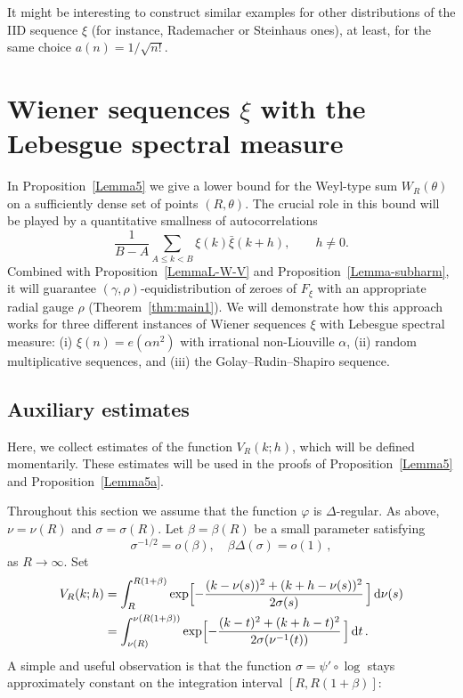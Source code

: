 \documentclass[11pt]{amsart}
\numberwithin{equation}{section}
\begin{document}
It might be interesting to construct similar examples for other distributions
of the IID sequence $\xi$ (for instance, Rademacher or Steinhaus ones),
at least, for the same choice $a(n)=1/\sqrt{n!}$.

\section{Wiener sequences $\xi$ with the Lebesgue spectral measure}
\label{sect:7}

In Proposition~\ref{Lemma5} we give a lower bound for the Weyl-type sum $W_R(\theta)$ on
a sufficiently dense set of points $(R, \theta)$. The crucial role in this bound will be
played by a quantitative smallness of autocorrelations
$$
\frac1{B-A}\sum_{A\le k < B} \xi(k)\bar\xi(k+h), \qquad h\ne 0. 
$$
Combined
with Proposition~\ref{LemmaL-W-V} and Proposition~\ref{Lemma-subharm}, 
it will guarantee $(\gamma, \rho)$-equidistribution
of zeroes of $F_\xi$ with an appropriate radial gauge $\rho$ (Theorem~\ref{thm:main1}).
We will demonstrate how this approach works for three different instances of Wiener sequences
$\xi$ with Lebesgue spectral measure: (i) $\xi (n) = e(\alpha n^2)$ with irrational non-Liouville $\alpha$, (ii) random multiplicative sequences, and (iii) the Golay--Rudin--Shapiro sequence.

\subsection{Auxiliary estimates}
Here, we collect estimates of the function \newline\noindent $V_R(k; h)$, which will be defined
momentarily. These estimates will be used in the proofs of Proposition~\ref{Lemma5}
and Proposition~\ref{Lemma5a}.

Throughout this section we assume that the function $\varphi$ is $\Delta$-regular.
As above, $\nu=\nu(R)$ and $\sigma=\sigma(R)$. Let $\beta=\beta(R)$ be a small parameter
satisfying
\[
\sigma^{-1/2} = o(\beta), \quad
\beta\Delta(\sigma) = o(1)\,,
\]
as $R\to\infty$. Set
\begin{align*}
V_R(k; h) &= \int_R^{R(1+\beta)}
\exp\Bigl[ -\frac{(k-\nu(s))^2 + (k+h-\nu(s))^2}{2\sigma(s)}\, \Bigr]\, {\rm d}\nu(s) \\
&=
\int_{\nu(R)}^{\nu(R(1+\beta))}
\exp\Bigl[ -\frac{(k-t)^2 + (k+h-t)^2}{2\sigma(\nu^{-1}(t))}\, \Bigr]\, {\rm d}t\,.
\end{align*}
A simple and useful observation is that the function $\sigma = \psi'\circ\log $ stays
approximately constant on the integration interval $[R, R(1+\beta)]$:
\end{document}
